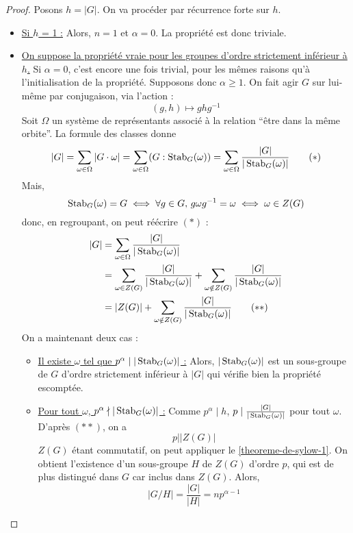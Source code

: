   \begin{proof}
    Posons $h = \vert G \vert$. On va procéder par récurrence forte sur $h$.
    \begin{itemize}
      \item \uline{Si $h$ = 1 :} Alors, $n = 1$ et $\alpha = 0$. La propriété est donc triviale.
      \item \uline{On suppose la propriété vraie pour les groupes d'ordre strictement inférieur à $h$.} Si $\alpha = 0$, c'est encore une fois trivial, pour les mêmes raisons qu'à l'initialisation de la propriété. Supposons donc $\alpha \geq 1$. On fait agir $G$ sur lui-même par conjugaison, via l'action :
      \[ (g,h) \mapsto ghg^{-1} \]
      Soit $\Omega$ un système de représentants associé à la relation ``être dans la même orbite''. La formule des classes donne
      \[ |G| = \sum_{\omega \in \Omega} |G \cdot \omega| = \sum_{\omega \in \Omega} (G : \operatorname{Stab}_G(\omega)) = \sum_{\omega \in \Omega} \frac{|G|}{|\operatorname{Stab}_G(\omega)|} \tag{$*$} \]
      Mais,
      \[ \operatorname{Stab}_G(\omega) = G \iff \forall g \in G, \, g \omega g^{-1} = \omega \iff \omega \in Z(G) \]
      donc, en regroupant, on peut réécrire $(*)$ :
      \begin{align*}
        |G| &= \sum_{\omega \in \Omega} \frac{|G|}{|\operatorname{Stab}_G(\omega)|} \\
        & = \sum_{\omega \in Z(G)} \frac{|G|}{|\operatorname{Stab}_G(\omega)|} + \sum_{\omega \notin Z(G)} \frac{|G|}{|\operatorname{Stab}_G(\omega)|} \\
        &= \vert Z(G) \vert + \sum_{\omega \notin Z(G)} \frac{|G|}{|\operatorname{Stab}_G(\omega)|} \tag{$**$}
      \end{align*}
      On a maintenant deux cas :
      \begin{itemize}
        \item \uline{Il existe $\omega$ tel que $p^\alpha \mid |\operatorname{Stab}_G(\omega)|$ :} Alors, $|\operatorname{Stab}_G(\omega)|$ est un sous-groupe de $G$ d'ordre strictement inférieur à $\vert G \vert$ qui vérifie bien la propriété escomptée.
        \item \uline{Pour tout $\omega$, $p^\alpha \nmid |\operatorname{Stab}_G(\omega)|$ :} Comme $p^\alpha \mid h$, $p \mid \frac{|G|}{|\operatorname{Stab}_G(\omega)|}$ pour tout $\omega$. D'après $(**)$, on a
        \[ p \mid \vert Z(G) \vert \]
        $Z(G)$ étant commutatif, on peut appliquer le \cref{theoreme-de-sylow-1}. On obtient l'existence d'un sous-groupe $H$ de $Z(G)$ d'ordre $p$, qui est de plus distingué dans $G$ car inclus dans $Z(G)$. Alors,
        \[ \vert G/H \vert = \frac{\vert G \vert}{\vert H \vert} = np^{\alpha - 1} \]

\end{itemize}
\end{itemize}
\end{proof}
